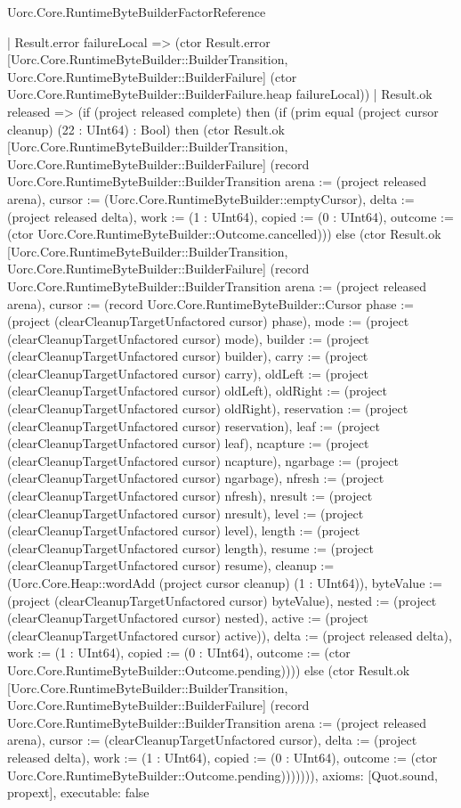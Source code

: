 \begin{lexlean}{Uorc.Core.RuntimeByteBuilderFactorReference}
\begin{semanticmodule}
{    | Result.error failureLocal => (ctor Result.error [Uorc.Core.RuntimeByteBuilder::BuilderTransition, Uorc.Core.RuntimeByteBuilder::BuilderFailure] (ctor Uorc.Core.RuntimeByteBuilder::BuilderFailure.heap failureLocal))
    | Result.ok released => (if (project released complete) then (if (prim equal (project cursor cleanup) (22 : UInt64) : Bool) then (ctor Result.ok [Uorc.Core.RuntimeByteBuilder::BuilderTransition, Uorc.Core.RuntimeByteBuilder::BuilderFailure] (record Uorc.Core.RuntimeByteBuilder::BuilderTransition {arena := (project released arena), cursor := (Uorc.Core.RuntimeByteBuilder::emptyCursor), delta := (project released delta), work := (1 : UInt64), copied := (0 : UInt64), outcome := (ctor Uorc.Core.RuntimeByteBuilder::Outcome.cancelled)})) else (ctor Result.ok [Uorc.Core.RuntimeByteBuilder::BuilderTransition, Uorc.Core.RuntimeByteBuilder::BuilderFailure] (record Uorc.Core.RuntimeByteBuilder::BuilderTransition {arena := (project released arena), cursor := (record Uorc.Core.RuntimeByteBuilder::Cursor {phase := (project (clearCleanupTargetUnfactored cursor) phase), mode := (project (clearCleanupTargetUnfactored cursor) mode), builder := (project (clearCleanupTargetUnfactored cursor) builder), carry := (project (clearCleanupTargetUnfactored cursor) carry), oldLeft := (project (clearCleanupTargetUnfactored cursor) oldLeft), oldRight := (project (clearCleanupTargetUnfactored cursor) oldRight), reservation := (project (clearCleanupTargetUnfactored cursor) reservation), leaf := (project (clearCleanupTargetUnfactored cursor) leaf), ncapture := (project (clearCleanupTargetUnfactored cursor) ncapture), ngarbage := (project (clearCleanupTargetUnfactored cursor) ngarbage), nfresh := (project (clearCleanupTargetUnfactored cursor) nfresh), nresult := (project (clearCleanupTargetUnfactored cursor) nresult), level := (project (clearCleanupTargetUnfactored cursor) level), length := (project (clearCleanupTargetUnfactored cursor) length), resume := (project (clearCleanupTargetUnfactored cursor) resume), cleanup := (Uorc.Core.Heap::wordAdd (project cursor cleanup) (1 : UInt64)), byteValue := (project (clearCleanupTargetUnfactored cursor) byteValue), nested := (project (clearCleanupTargetUnfactored cursor) nested), active := (project (clearCleanupTargetUnfactored cursor) active)}), delta := (project released delta), work := (1 : UInt64), copied := (0 : UInt64), outcome := (ctor Uorc.Core.RuntimeByteBuilder::Outcome.pending)}))) else (ctor Result.ok [Uorc.Core.RuntimeByteBuilder::BuilderTransition, Uorc.Core.RuntimeByteBuilder::BuilderFailure] (record Uorc.Core.RuntimeByteBuilder::BuilderTransition {arena := (project released arena), cursor := (clearCleanupTargetUnfactored cursor), delta := (project released delta), work := (1 : UInt64), copied := (0 : UInt64), outcome := (ctor Uorc.Core.RuntimeByteBuilder::Outcome.pending)})))))),
  axioms: [Quot.sound, propext],
  executable: false
}


\end{semanticmodule}
\end{lexlean}
